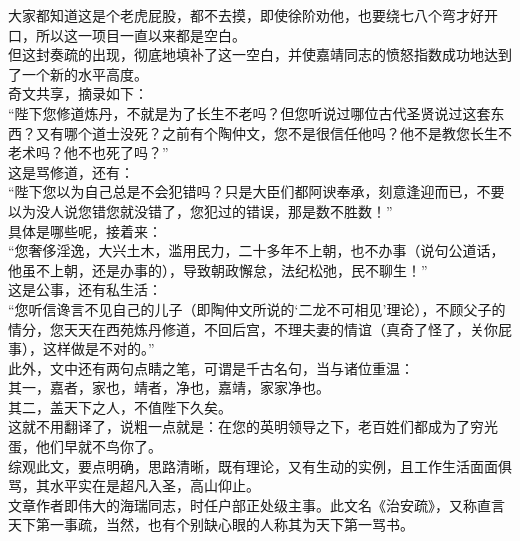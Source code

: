 \begin{multicols}{\theparacolNo}
大家都知道这是个老虎屁股，都不去摸，即使徐阶劝他，也要绕七八个弯才好开口，所以这一项目一直以来都是空白。\\

但这封奏疏的出现，彻底地填补了这一空白，并使嘉靖同志的愤怒指数成功地达到了一个新的水平高度。\\

奇文共享，摘录如下：\\

“陛下您修道炼丹，不就是为了长生不老吗？但您听说过哪位古代圣贤说过这套东西？又有哪个道士没死？之前有个陶仲文，您不是很信任他吗？他不是教您长生不老术吗？他不也死了吗？”\\

这是骂修道，还有：\\

“陛下您以为自己总是不会犯错吗？只是大臣们都阿谀奉承，刻意逢迎而已，不要以为没人说您错您就没错了，您犯过的错误，那是数不胜数！”\\

具体是哪些呢，接着来：\\

“您奢侈淫逸，大兴土木，滥用民力，二十多年不上朝，也不办事（说句公道话，他虽不上朝，还是办事的），导致朝政懈怠，法纪松弛，民不聊生！”\\

这是公事，还有私生活：\\

“您听信谗言不见自己的儿子（即陶仲文所说的‘二龙不可相见’理论），不顾父子的情分，您天天在西苑炼丹修道，不回后宫，不理夫妻的情谊（真奇了怪了，关你屁事），这样做是不对的。”\\

此外，文中还有两句点睛之笔，可谓是千古名句，当与诸位重温：\\

其一，嘉者，家也，靖者，净也，嘉靖，家家净也。\\

其二，盖天下之人，不值陛下久矣。\\

这就不用翻译了，说粗一点就是：在您的英明领导之下，老百姓们都成为了穷光蛋，他们早就不鸟你了。\\

综观此文，要点明确，思路清晰，既有理论，又有生动的实例，且工作生活面面俱骂，其水平实在是超凡入圣，高山仰止。\\

文章作者即伟大的海瑞同志，时任户部正处级主事。此文名《治安疏》，又称直言天下第一事疏，当然，也有个别缺心眼的人称其为天下第一骂书。\\


\end{multicols}
